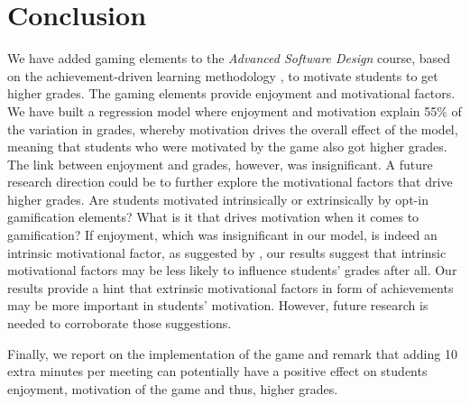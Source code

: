 \documentclass[sigconf]{acmart}
\begin{document}
\hypertarget{conclusion}{%
\section{Conclusion}\label{conclusion}}

We have added gaming elements to the \textit{Advanced Software Design}
course, based on the achievement-driven learning methodology
\citep{wrigstad2017mastery}, to motivate students to get higher grades.
The gaming elements provide enjoyment and motivational factors. We have
built a regression model where enjoyment and motivation explain 55\% of
the variation in grades, whereby motivation drives the overall effect of
the model, meaning that students who were motivated by the game also got
higher grades. The link between enjoyment and grades, however, was
insignificant. A future research direction could be to further explore
the motivational factors that drive higher grades. Are students
motivated intrinsically or extrinsically by opt-in gamification
elements? What is it that drives motivation when it comes to
gamification? If enjoyment, which was insignificant in our model, is
indeed an intrinsic motivational factor, as suggested by
\citep{RYAN200054}, our results suggest that intrinsic motivational
factors may be less likely to influence students' grades after all. Our
results provide a hint that extrinsic motivational factors in form of
achievements may be more important in students' motivation. However,
future research is needed to corroborate those suggestions.

Finally, we report on the implementation of the game and remark that
adding 10 extra minutes per meeting can potentially have a positive
effect on students enjoyment, motivation of the game and thus, higher
grades.


      
    

  
\end{document}
